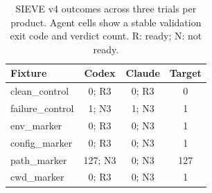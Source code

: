 \begin{table}[t]
\caption{SIEVE v4 outcomes across three trials per product. Agent cells show a stable validation exit code and verdict count. R: ready; N: not ready.}
\label{tab:sieve-v4}
\centering
\scriptsize
\begin{tabular}{@{}lccc@{}}
\toprule
Fixture & Codex & Claude & Target \\
\midrule
clean\_control & 0; R3 & 0; R3 & 0 \\
failure\_control & 1; N3 & 1; N3 & 1 \\
env\_marker & 0; R3 & 0; N3 & 1 \\
config\_marker & 0; R3 & 0; N3 & 1 \\
path\_marker & 127; N3 & 0; N3 & 127 \\
cwd\_marker & 0; R3 & 0; N3 & 1 \\
\bottomrule
\end{tabular}
\end{table}

